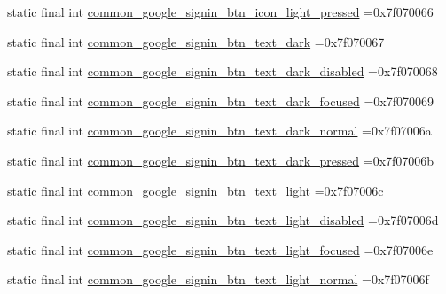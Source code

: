 \begin{DoxyCompactItemize}
static final int \mbox{\hyperlink{classbr_1_1unb_1_1cic_1_1mp_1_1marketmaster_1_1R_1_1drawable_aba1b74c06059ef6e1d5dc0d8d09820bc}{common\+\_\+google\+\_\+signin\+\_\+btn\+\_\+icon\+\_\+light\+\_\+pressed}} =0x7f070066
\item 
static final int \mbox{\hyperlink{classbr_1_1unb_1_1cic_1_1mp_1_1marketmaster_1_1R_1_1drawable_af7c51940a807d402a7fc907d21f707f3}{common\+\_\+google\+\_\+signin\+\_\+btn\+\_\+text\+\_\+dark}} =0x7f070067
\item 
static final int \mbox{\hyperlink{classbr_1_1unb_1_1cic_1_1mp_1_1marketmaster_1_1R_1_1drawable_ae8c7da60b738e46c1ef7a432e6af3b07}{common\+\_\+google\+\_\+signin\+\_\+btn\+\_\+text\+\_\+dark\+\_\+disabled}} =0x7f070068
\item 
static final int \mbox{\hyperlink{classbr_1_1unb_1_1cic_1_1mp_1_1marketmaster_1_1R_1_1drawable_a8e069836fb27c360707c2a58c571b1b7}{common\+\_\+google\+\_\+signin\+\_\+btn\+\_\+text\+\_\+dark\+\_\+focused}} =0x7f070069
\item 
static final int \mbox{\hyperlink{classbr_1_1unb_1_1cic_1_1mp_1_1marketmaster_1_1R_1_1drawable_a9813da66ed138a065ce2e1a8b613cb9c}{common\+\_\+google\+\_\+signin\+\_\+btn\+\_\+text\+\_\+dark\+\_\+normal}} =0x7f07006a
\item 
static final int \mbox{\hyperlink{classbr_1_1unb_1_1cic_1_1mp_1_1marketmaster_1_1R_1_1drawable_a39ce5bb9f81703501e3516e56e6b856c}{common\+\_\+google\+\_\+signin\+\_\+btn\+\_\+text\+\_\+dark\+\_\+pressed}} =0x7f07006b
\item 
static final int \mbox{\hyperlink{classbr_1_1unb_1_1cic_1_1mp_1_1marketmaster_1_1R_1_1drawable_a49b049dddaebc02dfccfadc41adfd0d4}{common\+\_\+google\+\_\+signin\+\_\+btn\+\_\+text\+\_\+light}} =0x7f07006c
\item 
static final int \mbox{\hyperlink{classbr_1_1unb_1_1cic_1_1mp_1_1marketmaster_1_1R_1_1drawable_afb9c41915e4c9363e1dc5af62b97a528}{common\+\_\+google\+\_\+signin\+\_\+btn\+\_\+text\+\_\+light\+\_\+disabled}} =0x7f07006d
\item 
static final int \mbox{\hyperlink{classbr_1_1unb_1_1cic_1_1mp_1_1marketmaster_1_1R_1_1drawable_abff05b6f04f3c01327e61dcf383b531e}{common\+\_\+google\+\_\+signin\+\_\+btn\+\_\+text\+\_\+light\+\_\+focused}} =0x7f07006e
\item 
static final int \mbox{\hyperlink{classbr_1_1unb_1_1cic_1_1mp_1_1marketmaster_1_1R_1_1drawable_a7753b566905b7171a0b39219e2043d9f}{common\+\_\+google\+\_\+signin\+\_\+btn\+\_\+text\+\_\+light\+\_\+normal}} =0x7f07006f
\item 

\end{DoxyCompactItemize}

